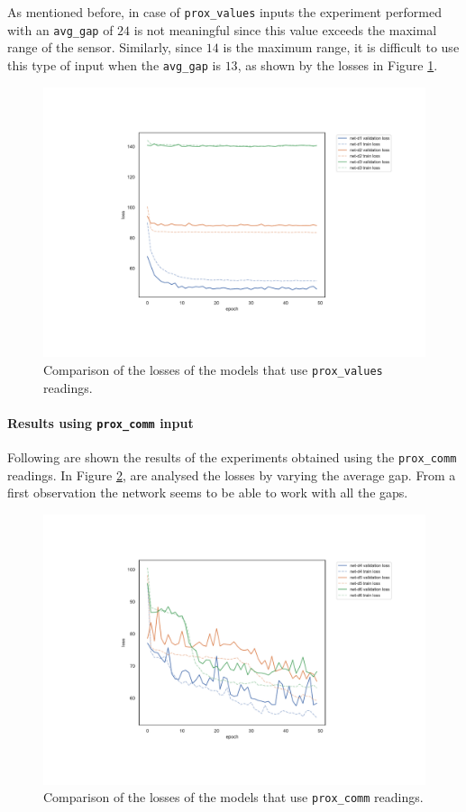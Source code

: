 As mentioned before, in case of \texttt{prox\_values} inputs the 
experiment performed with an \texttt{avg\_gap} of $24$ is not meaningful since 
this value exceeds the maximal range of the sensor. Similarly, since $14$ is the 
maximum range, it is difficult to use this type of input when the \texttt{avg\_gap}  
is $13$, as shown by the losses in Figure \ref{fig:distlossprox_values}.
\begin{figure}[!htb]
	\centering
	\includegraphics[width=.85\textwidth]{contents/images/task1/loss-distributed-prox_values@}%
	\caption{Comparison of the losses of the models that use \texttt{prox\_values} 
		readings.}
	\label{fig:distlossprox_values}
\end{figure}

\paragraph*{Results using \texttt{prox\_comm} input}
Following are shown the results of the experiments obtained using the 
\texttt{prox\_comm} readings. 
In Figure \ref{fig:distlossprox_comm}, are analysed the losses by varying the 
average gap. From a first observation the network seems to be able to work with 
all the gaps.
\begin{figure}[!htb]
	\centering
	\includegraphics[width=.85\textwidth]{contents/images/task1/loss-distributed-prox_comm@}%
	\caption{Comparison of the losses of the models that use \texttt{prox\_comm} 
		readings.}
	\label{fig:distlossprox_comm}
\end{figure}

